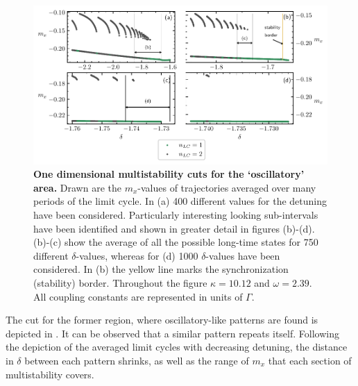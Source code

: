 \begin{figure}[H]
    \hspace*{-1.2cm}
    \includegraphics{pictures/multistab_line.pdf}
    \caption{\textbf{One dimensional multistability cuts for the {\lq oscillatory\rq} area.} Drawn are the $m_x$-values of trajectories averaged over many periods of the limit cycle. In (a) 400 different values for the detuning have been considered. Particularly interesting looking sub-intervals have been identified and shown in greater detail in figures (b)-(d). (b)-(c) show the average of all the possible long-time states for 750 different $\delta$-values, whereas for (d) 1000 $\delta$-values have been considered. In (b) the yellow line marks the synchronization (stability) border. Throughout the figure $\kappa=10.12$ and $\omega=2.39$. All coupling constants are represented in units of $\Gamma$.}
    \label{fig:osci_cut}
\end{figure}\newpage
The cut for the former region, where oscillatory-like patterns are found is depicted in . It can be observed that a similar pattern repeats itself. Following the depiction of the averaged limit cycles with decreasing detuning, the distance in $\delta$ between each pattern shrinks, as well as the range of $m_x$ that each section of multistability covers. 

